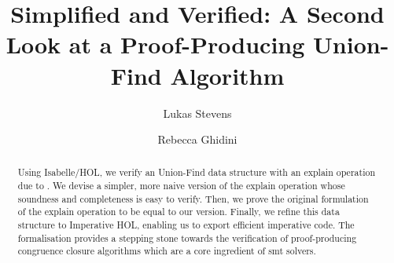 \documentclass[
  sigplan,
  10pt,
  anonymous,
  review,
  ]{acmart}
\begin{document}

\setcounter{tocdepth}{1}

\title{Simplified and Verified: A Second Look at a Proof-Producing Union-Find Algorithm}
\author{Lukas Stevens}

\author{Rebecca Ghidini}

\begin{abstract}
Using Isabelle/HOL, we verify an Union-Find data structure with an explain operation due to \citeauthor{congcl_proofs}.
We devise a simpler, more naive version of the explain operation whose soundness and completeness is easy to verify.
Then, we prove the original formulation of the explain operation to be equal to our version.
Finally, we refine this data structure to Imperative HOL, enabling us to export efficient imperative code.
The formalisation provides a stepping stone towards the verification of proof-producing congruence closure algorithms which are a core ingredient of \acrfull{smt} solvers.
\end{abstract}

\maketitle
\end{document}
